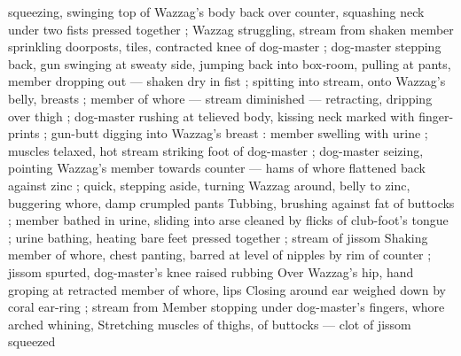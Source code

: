 squeezing, swinging top of Wazzag's body back over counter, 
squashing neck under two fists pressed together ; Wazzag 
struggling, stream from shaken member sprinkling doorposts, tiles, 
contracted knee of dog-master ; dog-master stepping back, gun 
swinging at sweaty side, jumping back into box-room, pulling at 
pants, member dropping out --- shaken dry in fist ; spitting into 
stream, onto Wazzag's belly, breasts ; member of whore --- stream 
diminished --- retracting, dripping over thigh ; dog-master rushing at 
telieved body, kissing neck marked with finger-prints ; gun-butt 
digging into Wazzag's breast : member swelling with urine ; muscles 
telaxed, hot stream striking foot of dog-master ; dog-master seizing, 
pointing Wazzag's member towards counter --- hams of whore 
flattened back against zinc ; quick, stepping aside, turning Wazzag 
around, belly to zinc, buggering whore, damp crumpled pants 
Tubbing, brushing against fat of buttocks ; member bathed in urine, 
sliding into arse cleaned by flicks of club-foot's tongue ; urine 
bathing, heating bare feet pressed together ; stream of jissom 
Shaking member of whore, chest panting, barred at level of nipples 
by rim of counter ; jissom spurted, dog-master's knee raised rubbing 
Over Wazzag's hip, hand groping at retracted member of whore, lips 
Closing around ear weighed down by coral ear-ring ; stream from 
Member stopping under dog-master's fingers, whore arched whining, 
Stretching muscles of thighs, of buttocks --- clot of jissom squeezed 
